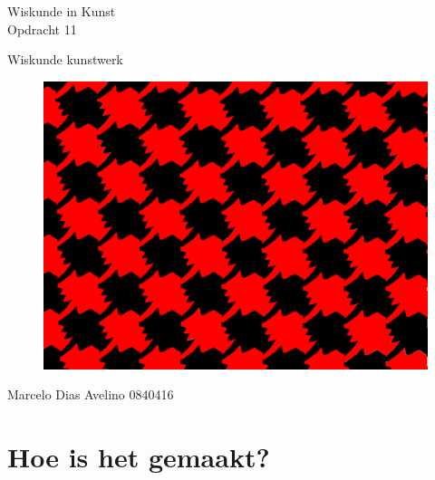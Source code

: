 \documentclass{article}
\begin{document}
\begin{center}
	\huge{Wiskunde in Kunst}\\
	\LARGE{Opdracht 11} \\
	
	\vspace{2cm}
	
	\Large{Wiskunde kunstwerk}\\
	
	\vfill
	
	\begin{figure}[Hh]
		\centering
		\includegraphics[width=\textwidth]{tesselation.png}
	\end{figure}
	
	\vfill
	\Large{Marcelo Dias Avelino} \hfill \large{0840416}
\end{center}

\thispagestyle{empty} %

\pagebreak

\setcounter{page}{1} %

\section{Hoe is het gemaakt?}
\end{document}
